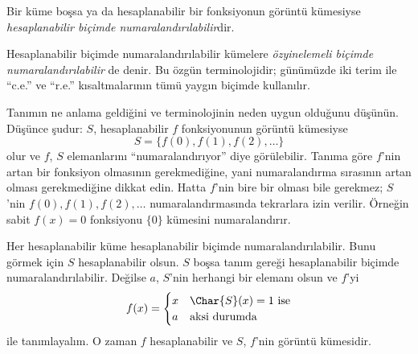 


\begin{defn}
Bir küme boşsa ya da hesaplanabilir bir fonksiyonun görüntü kümesiyse
\emph{hesaplanabilir biçimde numaralandırılabilir}dir.
\end{defn}

\begin{history}
Hesaplanabilir biçimde numaralandırılabilir kümelere \emph{özyinelemeli
biçimde numaralandırılabilir} de denir. Bu özgün terminolojidir; günümüzde
iki terim ile ``c.e.'' ve ``r.e.'' kısaltmalarının tümü yaygın biçimde
kullanılır.
\end{history}

\begin{explain}
Tanımın ne anlama geldiğini ve terminolojinin neden uygun olduğunu düşünün.
Düşünce şudur: $S$, hesaplanabilir $f$ fonksiyonunun görüntü kümesiyse
\[
  S=\{f(0),f(1),f(2),\dots\}
\]
olur ve $f$, $S$ elemanlarını ``numaralandırıyor'' diye görülebilir. Tanıma
göre $f$'nin artan bir fonksiyon olmasının gerekmediğine, yani numaralandırma
sırasının artan olması gerekmediğine dikkat edin. Hatta $f$'nin bire bir
olması bile gerekmez; $S$'nin $f(0),f(1),f(2),\dots$ numaralandırmasında
tekrarlara izin verilir. Örneğin sabit $f(x)=0$ fonksiyonu $\{0\}$ kümesini
numaralandırır.
\end{explain}

Her hesaplanabilir küme hesaplanabilir biçimde numaralandırılabilir. Bunu
görmek için $S$ hesaplanabilir olsun. $S$ boşsa tanım gereği hesaplanabilir
biçimde numaralandırılabilir. Değilse $a$, $S$'nin herhangi bir elemanı olsun
ve $f$'yi
\[
  f(x)=\begin{cases}
    x & \text{$\Char{S}(x)=1$ ise}\\
    a & \text{aksi durumda}
  \end{cases}
\]
ile tanımlayalım. O zaman $f$ hesaplanabilir ve $S$, $f$'nin görüntü
kümesidir.

